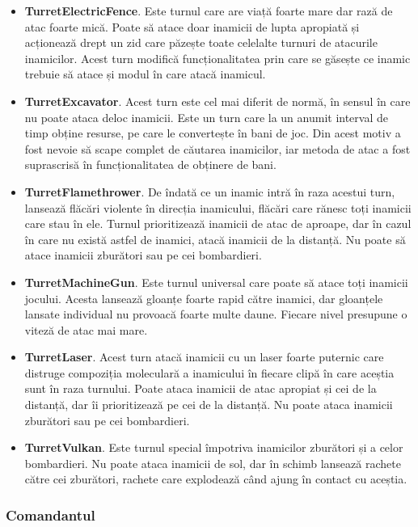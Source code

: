 \documentclass[12pt, a4paper]{article}
\begin{document}
	\begin{itemize}
		\item \textbf{TurretElectricFence}. Este turnul care are viață foarte mare dar rază de atac foarte mică. Poate să atace doar inamicii de lupta apropiată și acționează drept un zid care păzește toate celelalte turnuri de atacurile inamicilor. Acest turn modifică funcționalitatea prin care se găsește ce inamic trebuie să atace și modul în care atacă inamicul.
		\item \textbf{TurretExcavator}. Acest turn este cel mai diferit de normă, în sensul în care nu poate ataca deloc inamicii. Este un turn care la un anumit interval de timp obține resurse, pe care le convertește în bani de joc. Din acest motiv a fost nevoie să scape complet de căutarea inamicilor, iar metoda de atac a fost suprascrisă în funcționalitatea de obținere de bani.
		\item \textbf{TurretFlamethrower}. De îndată ce un inamic intră în raza acestui turn, lansează flăcări violente în direcția inamicului, flăcări care rănesc toți inamicii care stau în ele. Turnul prioritizează inamicii de atac de aproape, dar în cazul în care nu există astfel de inamici, atacă inamicii de la distanță. Nu poate să atace inamicii zburători sau pe cei bombardieri.
		\item \textbf{TurretMachineGun}. Este turnul universal care poate să atace toți inamicii jocului. Acesta lansează gloanțe foarte rapid către inamici, dar gloanțele lansate individual nu provoacă foarte multe daune. Fiecare nivel presupune o viteză de atac mai mare.
		\item \textbf{TurretLaser}. Acest turn atacă inamicii cu un laser foarte puternic care distruge compoziția moleculară a inamicului în fiecare clipă în care aceștia sunt în raza turnului. Poate ataca inamicii de atac apropiat și cei de la distanță, dar îi prioritizează pe cei de la distanță. Nu poate ataca inamicii zburători sau pe cei bombardieri.
		\item \textbf{TurretVulkan}. Este turnul special împotriva inamicilor zburători și a celor bombardieri. Nu poate ataca inamicii de sol, dar în schimb lansează rachete către cei zburători, rachete care explodează când ajung în contact cu aceștia.
	\end{itemize}
	
	
	
	
	
	\subsubsection{Comandantul}
	\label{section: commander}
	
\end{document}
